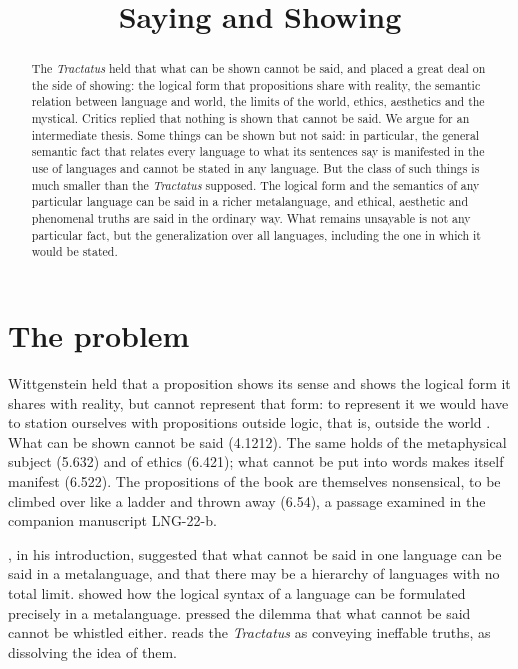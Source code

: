\documentclass{situationist-preprint}
\title{Saying and Showing}
\begin{document}
\maketitle

\begin{abstract}
The \emph{Tractatus} held that what can be shown cannot be said, and placed a great deal on the side of showing: the logical form that propositions share with reality, the semantic relation between language and world, the limits of the world, ethics, aesthetics and the mystical. Critics replied that nothing is shown that cannot be said. We argue for an intermediate thesis. Some things can be shown but not said: in particular, the general semantic fact that relates every language to what its sentences say is manifested in the use of languages and cannot be stated in any language. But the class of such things is much smaller than the \emph{Tractatus} supposed. The logical form and the semantics of any particular language can be said in a richer metalanguage, and ethical, aesthetic and phenomenal truths are said in the ordinary way. What remains unsayable is not any particular fact, but the generalization over all languages, including the one in which it would be stated.
\end{abstract}

\section{The problem}

Wittgenstein held that a proposition shows its sense and shows the logical form it shares with reality, but cannot represent that form: to represent it we would have to station ourselves with propositions outside logic, that is, outside the world \citep[4.12, 4.121]{Wittgenstein1922}. What can be shown cannot be said (4.1212). The same holds of the metaphysical subject (5.632) and of ethics (6.421); what cannot be put into words makes itself manifest (6.522). The propositions of the book are themselves nonsensical, to be climbed over like a ladder and thrown away (6.54), a passage examined in the companion manuscript LNG-22-b.

\citet{Russell1922}, in his introduction, suggested that what cannot be said in one language can be said in a metalanguage, and that there may be a hierarchy of languages with no total limit. \citet{Carnap1937} showed how the logical syntax of a language can be formulated precisely in a metalanguage. \citet{Ramsey1931} pressed the dilemma that what cannot be said cannot be whistled either. \citet{Hacker2000} reads the \emph{Tractatus} as conveying ineffable truths, \citet{Diamond1988} as dissolving the idea of them.
\end{document}
